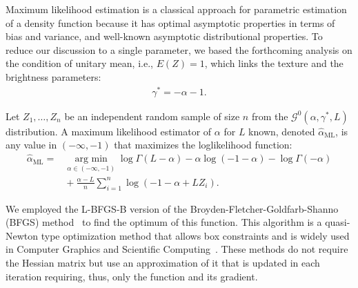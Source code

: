 \documentclass[twocolumn]{svjour3}
\newcommand{\argmin}{\operatorname*{\text{arg min }}}
\begin{document}
Maximum likelihood estimation is a classical approach for parametric estimation of a density function because it has optimal asymptotic properties in terms of bias and variance, and well-known asymptotic distributional properties.
To reduce our discussion to a single parameter, we based the forthcoming analysis on the condition of unitary mean, i.e., $E(Z)=1$, which links the texture and the brightness parameters:
\begin{align}
\label{RelationAlphaGamma}
\gamma^* =-\alpha-1.
\end{align}

Let $Z_1,\dots, Z_n$ be an independent random sample of size $n$ from the $\mathcal G^0(\alpha,\gamma^*,L)$ distribution.
A maximum likelihood estimator of $\alpha$ for $L$ known, denoted $\widehat\alpha_{\text{{ML}}}$, is any value in $(-\infty,-1)$ that maximizes the loglikelihood function:
\begin{align}
\hat{\alpha}_{\text{{ML}}}=&\argmin_{\alpha \in (-\infty,-1)}\log \Gamma(L-\alpha)-
\alpha\log(-1-\alpha)-\log\Gamma(-\alpha) \nonumber \\
&\mbox{}+\frac{\alpha-L}{n} \sum_{i=1}^n\log(-1-\alpha+L Z_i).
\label{ML}
\end{align}

We employed the L-BFGS-B version of the Broyden-Fletcher-Goldfarb-Shanno (BFGS) method~\cite{Luenberger2008} to find the optimum of this function. This algorithm is a quasi-Newton type optimization method that allows box constraints and is widely used in Computer Graphics and Scientific Computing~\cite{FEI2014}. 
These methods do not require the Hessian matrix but use an approximation of it that is updated in each iteration requiring, thus, only the function and its gradient.
\end{document}

